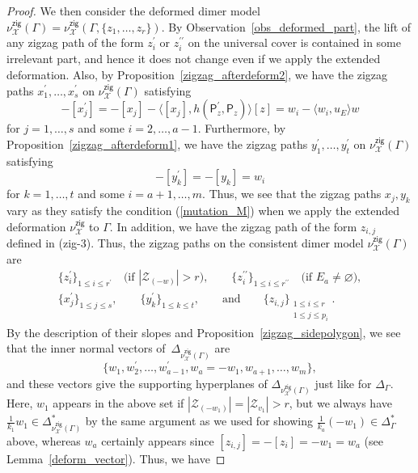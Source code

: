 \documentclass[11pt]{article}
\numberwithin{equation}{section}
\numberwithin{equation}{section}
\numberwithin{figure}{section}
\numberwithin{table}{section}
\newcommand{\calX}{\mathcal{X}}
\newcommand{\calZ}{\mathcal{Z}}
\newcommand{\sfP}{\mathsf{P}}
\newcommand{\zig}{\mathsf{zig}}
\begin{document}
\begin{proof}
We then consider the deformed dimer model $\nu^\zig_\calX(\Gamma)=\nu^\zig_\calX(\Gamma,\{z_1,\dots,z_r\})$.
By Observation~\ref{obs_deformed_part}, the lift of any zigzag path of the form $z_i^\prime$ or $z_i^{\prime\prime}$ on the universal cover is contained in some irrelevant part, and hence it does not change even if we apply the extended deformation.
Also, by Proposition~\ref{zigzag_afterdeform2}, we have the zigzag paths $x_1^\prime,\dots,x_s^\prime$ on $\nu^\zig_\calX(\Gamma)$ satisfying
\begin{displaymath}
-[x^{\prime}_j]=-[x_j]-\langle [x_j],h(\sfP_z^\prime,\sfP_z)\rangle[z]=w_i-\langle w_i,u_E\rangle w
\end{displaymath}
for $j=1,\dots,s$ and some $i=2,\dots,a-1$.
Furthermore, by Proposition~\ref{zigzag_afterdeform1}, we have the zigzag paths $y_1^\prime,\dots,y_t^\prime$ on $\nu^\zig_\calX(\Gamma)$ satisfying
\begin{displaymath}
-[y_k^\prime]=-[y_k]=w_i
\end{displaymath}
for $k=1,\dots,t$ and some $i=a+1,\dots,m$.
Thus, we see that the zigzag paths $x_j, y_k$ vary as they satisfy the condition (\ref{mutation_M}) when we apply the extended deformation $\nu^\zig_\calX$ to $\Gamma$.
In addition, we have the zigzag path of the form $z_{i,j}$ defined in (zig-3).
Thus, the zigzag paths on the consistent dimer model $\nu^\zig_\calX(\Gamma)$ are
\begin{gather*}
\{z_i^\prime\}_{1\le i\le r^\prime}\quad \text{(if $|\calZ_{(-w)}|>r$)},\qquad \{z_i^{\prime\prime}\}_{1\le i\le r^{\prime\prime}}\quad \text{(if $E_a\neq\varnothing$)},\\
\{x_j^\prime\}_{1\le j\le s},\qquad \{y_k^\prime\}_{1\le k\le t},\qquad \text{and} \qquad \{z_{i,j}\}_{\substack{1\le i\le r \\ 1\le j\le p_i}}.
\end{gather*}
By the description of their slopes and Proposition~\ref{zigzag_sidepolygon}, we see that the inner normal vectors of~$\Delta_{\nu^\zig_\calX(\Gamma)}$ are
\begin{displaymath}
\{w_1,w_2^\prime,\dots,w_{a-1}^\prime,w_a=-w_1, w_{a+1}, \dots,w_m\},
\end{displaymath}
and these vectors give the supporting hyperplanes of $\Delta_{\nu^\zig_\calX(\Gamma)}$ just like for $\Delta_\Gamma$.
Here, $w_1$ appears in the above set if $|\calZ_{(-w_1)}|=|\calZ_{v_1}|>r$,
but we always have $\frac{1}{k_1}w_1\in \Delta_{\nu^\zig_\calX(\Gamma)}^*$ by the same argument as we used for showing $\frac{1}{k_a}(-w_1)\in\Delta_\Gamma^*$ above, whereas $w_a$ certainly appears since $[z_{i,j}]=-[z_i]=-w_1=w_a$ (see Lemma~\ref{deform_vector}). Thus, we have

\end{proof}
\end{document}
